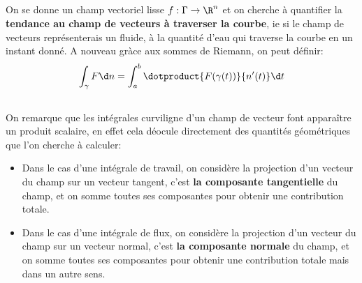 \subsection*{}
On se donne un champ vectoriel lisse \(f : \Gamma \rightarrow \R^n\) et on cherche à quantifier la \textbf{tendance au champ de vecteurs à traverser la courbe}, ie si le champ de vecteurs représenterais un fluide, à la quantité d'eau qui traverse la courbe en un instant donné. A nouveau gràce aux sommes de Riemann, on peut définir:
\[
   \int_{\gamma} F \d n = \int_{a}^{b} \dotproduct{F(\gamma(t))}{n'(t)}\d t
\]
\subsection*{}
On remarque que les intégrales curviligne d'un champ de vecteur font apparaître un produit scalaire, en effet cela déocule directement des quantités géométriques que l'on cherche à calculer:
\begin{itemize}
   \item Dans le cas d'une intégrale de travail, on considère la projection d'un vecteur du champ sur un vecteur tangent, c'est \textbf{la composante tangentielle} du champ, et on somme toutes ses composantes pour obtenir une contribution totale.
   \item Dans le cas d'une intégrale de flux, on considère la projection d'un vecteur du champ sur un vecteur normal, c'est \textbf{la composante normale} du champ, et on somme toutes ses composantes pour obtenir une contribution totale mais dans un autre sens.
\end{itemize}
